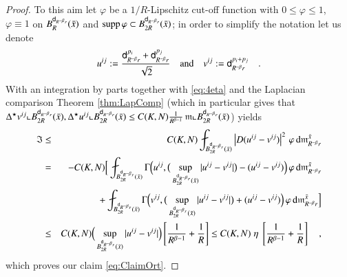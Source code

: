 \documentclass[11pt,reqno]{amsart}
\newcommand{\supp}{\mathop{\rm supp}\nolimits}
\newcommand{\mm}{\mathfrak m}
\newcommand{\sfd}{{\sf d}}
\renewcommand{\d}{{\rm{d}}}
\newcommand{\vare}{\varepsilon}
\theoremstyle{definition}
\theoremstyle{remark}
\theoremstyle{remark}
\theoremstyle{remark}
\theoremstyle{remark}
\theoremstyle{remark}
\theoremstyle{remark}
\theoremstyle{remark}
\begin{document}
\begin{proof}
To this aim let $\varphi$ be a $1/R$-Lipschitz cut-off function with $0\leq \varphi \leq 1$, $\varphi\equiv 1$ on $B^{\sfd_{R^{-\beta} r}}_R(\bar{x})$ and $\supp \varphi \subset B^{\sfd_{R^{-\beta} r}}_{2R}(\bar{x})$; in order to simplify the notation let us denote 
\begin{equation}\label{eq:defuijvij}
u^{ij}:= \frac{\sfd_{R^{-\beta} r}^{p_i}+\sfd_{R^{-\beta} r}^{p_j}} {\sqrt 2} \quad  \text{and} \quad  v^{ij}:=\sfd_{R^{-\beta} r}^{p_i+p_j}\quad .
\end{equation}
 With an integration by parts together with \eqref{eq:4eta} and the Laplacian comparison Theorem \ref{thm:LapComp} (which in particular gives that $\Delta^\star v^{ij} \llcorner B^{\sfd_{R^{-\beta} r}}_{2R}(\bar{x}),\Delta^\star u^{ij}\llcorner B^{\sfd_{R^{-\beta} r}}_{2R}(\bar{x}) \leq  C(K,N) \frac{1}{R^{\beta-1}}\, \mm\llcorner B^{\sfd_{R^{-\beta} r}}_{2R}(\bar{x})$) yields
\begin{eqnarray}
{\mathfrak {I}} &\leq & C(K,N) \fint_{B^{\sfd_{R^{-\beta} r}}_{2R}(\bar{x})} \left|D (u^{ij}-v^{ij}) \right|^2 \, \varphi \, \d \mm_{R^{-\beta} r}^{\bar{x}} \nonumber \\
&=& - C(K,N)\Big[ \fint_{B^{\sfd_{R^{-\beta} r}}_{2R}(\bar{x})} \Gamma \Big(u^{ij}, \big(\sup_{{B^{\sfd_{R^{-\beta} r}}_{2R}(\bar{x})} } |u^{ij}-v^{ij}| \big)-(u^{ij}-v^{ij}) \Big) \, \varphi \, \d \mm_{R^{-\beta} r}^{\bar{x}}  \nonumber \\
&& \quad \quad \quad \quad  + \fint_{B^{\sfd_{R^{-\beta} r}}_{2R}(\bar{x})} \Gamma\Big(v^{ij}, \big(\sup_{{B^{\sfd_{R^{-\beta} r}}_{2R}(\bar{x})} } |u^{ij}-v^{ij}| \big)+(u^{ij}-v^{ij}) \Big) \, \varphi \, \d \mm_{R^{-\beta} r}^{\bar{x}}   \Big]\nonumber \\
&\leq& C(K,N) \Big(\sup_{{B^{\sfd_{R^{-\beta} r}}_{2R}(\bar{x})} } |u^{ij}-v^{ij}| \Big) \left[  \frac{1}{R^{\beta-1}}+\frac{1}{R}  \right] \leq C(K,N)\; \eta \;  \left[  \frac{1}{R^{\beta-1}}+\frac{1}{R}  \right] \quad , \nonumber
\end{eqnarray}
which proves our claim \eqref{eq:ClaimOrt}. %
\end{proof}
 
\end{document}
